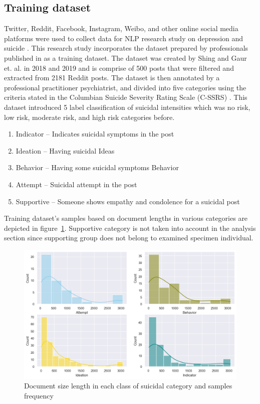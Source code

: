 \documentclass[sn-mathphys,Numbered]{sn-jnl}%
\theoremstyle{thmstyleone}%
\theoremstyle{thmstyletwo}%
\theoremstyle{thmstylethree}%
\begin{document}
\subsection{Training dataset}
Twitter, Reddit, Facebook, Instagram, Weibo, and other online social media platforms were used to collect data for NLP research study on depression and suicide \cite{wang2020depression, malhotra2022deep}. This research study incorporates the dataset prepared by professionals published in \cite{gaur2019knowledge} as a training dataset. The dataset was created by Shing and Gaur et. al. in 2018 \cite{shing2018expert} and 2019 \cite{gaur2019knowledge} and is comprise of 500 posts that were filtered and extracted from 2181 Reddit posts. The dataset is then annotated by a professional practitioner psychiatrist, and divided into five categories using the criteria stated in the Columbian Suicide Severity Rating Scale (C-SSRS) \cite{gaur2019knowledge}. This dataset introduced 5 label classification of suicidal intensities which was no risk, low risk, moderate risk, and high risk categories before. 
\begin{enumerate}[label=(\roman*)]
\item Indicator – Indicates suicidal symptoms in the post
\item Ideation – Having suicidal Ideas 
\item Behavior – Having some suicidal symptoms Behavior
\item Attempt – Suicidal attempt in the post
\item Supportive – Someone shows empathy and condolence for a suicidal post
\end{enumerate}
%
Training dataset's \cite{gaur2019knowledge} samples based on document lengths in various categories are depicted in figure~\ref{Reddit_cssrs_doc_len_freq}. Supportive category is not taken into account in the analysis section since supporting group does not belong to examined specimen individual. 
%
\begin{figure}[H]
\centering
\includegraphics[width=\textwidth]{document_size_length_in_each_class.png}
\caption{Document size length in each class of suicidal category and samples frequency}
\label{Reddit_cssrs_doc_len_freq}
\end{figure}
%
\end{document}
